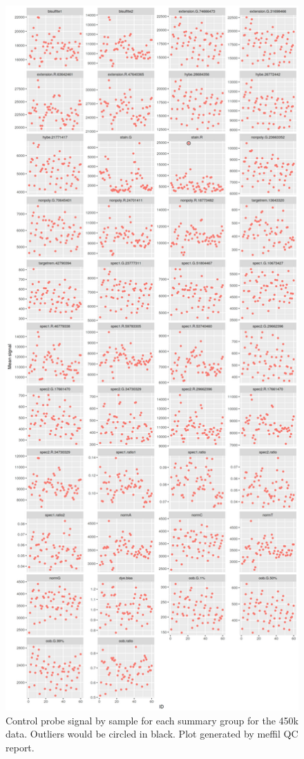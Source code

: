 \documentclass[
]{book}
\begin{document}
\begin{figure}

{\centering \includegraphics[width=0.8\linewidth]{figs/MAVIDOSqc450kctrlProbes} 

}

\caption{Control probe signal by sample for each summary group for the 450k data. Outliers would be circled in black. Plot generated by meffil QC report.}\label{fig:MAVIDOSqc450kctrlProbes}
\end{figure}
\end{document}
